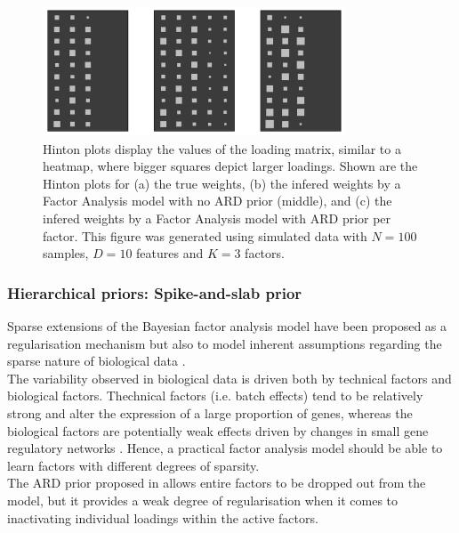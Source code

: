\begin{figure}[H] \begin{center}
	\includegraphics[width=0.8\textwidth]{Chapter2/Figs/hinton}
            \caption[(Copied from Damien's thesis) Hinton plot of the loading matrix for a Bayesian Factor Analysis model with an ARD prior]{Hinton plots display the values of the loading matrix, similar to a heatmap, where bigger squares depict larger loadings. Shown are the Hinton plots for (a) the true weights, (b) the infered weights by a Factor Analysis model with no ARD prior (middle), and (c) the infered weights by a Factor Analysis model with ARD prior per factor. This figure was generated using simulated data with $N=100$ samples, $D=10$ features and $K=3$ factors.}
	\label{fig:hinton}
\end{center} \end{figure}

\subsubsection{Hierarchical priors: Spike-and-slab prior}
Sparse extensions of the Bayesian factor analysis model have been proposed as a regularisation mechanism but also to model inherent assumptions regarding the sparse nature of biological data \cite{Stegle2012,Gao2013}.\\
The variability observed in biological data is driven both by technical factors and biological factors. Thechnical factors (i.e. batch effects) tend to be relatively strong and alter the expression of a large proportion of genes, whereas the biological factors are potentially weak effects driven by changes in small gene regulatory networks \cite{Gao2013}. Hence, a practical factor analysis model should be able to learn factors with different degrees of sparsity.\\
The ARD prior proposed in  allows entire factors to be dropped out from the model, but it provides a weak degree of regularisation when it comes to inactivating individual loadings within the active factors.

